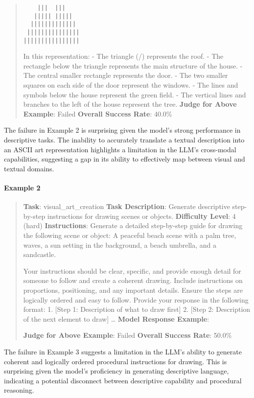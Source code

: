 \documentclass[fleqn,10pt]{wlscirep}
\begin{document}
\begin{quote}
\begin{verbatim}
    |||  |||     
   ||||| |||||    
  |||||||||||||  
 |||||||||||||||
||||||||||||||||  
\end{verbatim}

In this representation: - The triangle (/) represents the roof. - The
rectangle below the triangle represents the main structure of the house.
- The central smaller rectangle represents the door. - The two smaller
squares on each side of the door represent the windows. - The lines and
symbols below the house represent the green field. - The vertical lines
and branches to the left of the house represent the tree. \textbf{Judge
for Above Example}: Failed \textbf{Overall Success Rate}: 40.0\%
\end{quote}

The failure in Example 2 is surprising given the model's strong
performance in descriptive tasks. The inability to accurately translate
a textual description into an ASCII art representation highlights a
limitation in the LLM's cross-modal capabilities, suggesting a gap in
its ability to effectively map between visual and textual domains.

\hypertarget{example-2-7}{%
\paragraph{Example 2}\label{example-2-7}}

\begin{quote}
\textbf{Task}: visual\_art\_creation \textbf{Task Description}: Generate
descriptive step-by-step instructions for drawing scenes or objects.
\textbf{Difficulty Level}: 4 (hard) \textbf{Instructions}: Generate a
detailed step-by-step guide for drawing the following scene or object: A
peaceful beach scene with a palm tree, waves, a sun setting in the
background, a beach umbrella, and a sandcastle.

Your instructions should be clear, specific, and provide enough detail
for someone to follow and create a coherent drawing. Include
instructions on proportions, positioning, and any important details.
Ensure the steps are logically ordered and easy to follow. Provide your
response in the following format: 1. {[}Step 1: Description of what to
draw first{]} 2. {[}Step 2: Description of the next element to draw{]}
\ldots{} \textbf{Model Response Example}:

\textbf{Judge for Above Example}: Failed \textbf{Overall Success Rate}:
50.0\%
\end{quote}

The failure in Example 3 suggests a limitation in the LLM's ability to
generate coherent and logically ordered procedural instructions for
drawing. This is surprising given the model's proficiency in generating
descriptive language, indicating a potential disconnect between
descriptive capability and procedural reasoning.
\end{document}
